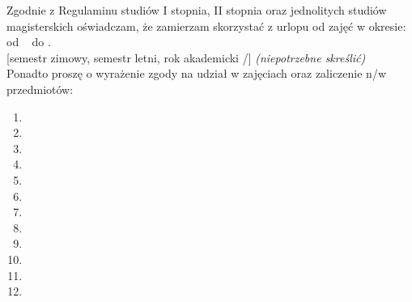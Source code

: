 \documentclass{wmiisubmission}
\begin{document}
\cracowdate
{}
\studentaddress
\addressee[-1.0cm]{\piotrniemiec}

\vskip 1cm



Zgodnie z Regulaminu studiów I stopnia, II stopnia oraz jednolitych studiów
magisterskich oświadczam, że zamierzam skorzystać z urlopu od zajęć w okresie:
od \dotfill~ do \dotfill.\\
{[semestr zimowy, semestr letni, rok akademicki \fillField{1cm}/\fillField{1cm}]}
\textit{    (niepotrzebne skreślić)}\\
Ponadto proszę o wyrażenie zgody na udział w zajęciach oraz zaliczenie n/w przedmiotów:

    \begin{multicols}{2}
    \begin{enumerate}
        \item \dotfill
        \item \dotfill
        \item \dotfill
        \item \dotfill
        \item \dotfill
        \item \dotfill
        \item \dotfill
        \item \dotfill
        \item \dotfill
        \item \dotfill
        \item \dotfill
        \item \dotfill
    \end{enumerate}
    \end{multicols}

\vskip 1.0cm

\studentsignature

\vfill


\end{document}
